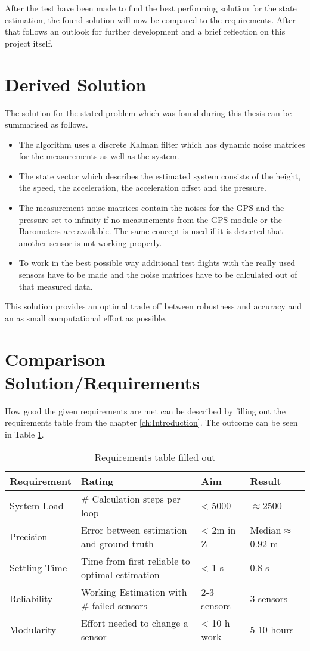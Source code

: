After the test have been made to find the best performing solution for the state estimation,
the found solution will now be compared to the requirements.
After that follows an outlook for further development and a brief reflection on this project itself.

\section{Derived Solution}
The solution for the stated problem which was found during this thesis can be summarised as follows.
\begin{itemize}
 \item The algorithm uses a discrete Kalman filter which has dynamic noise matrices for the measurements as well as the system.
 \item The state vector which describes the estimated system consists of the height, the speed, the acceleration, the acceleration offset and the pressure.
 \item The measurement noise matrices contain the noises for the GPS and the pressure set to infinity if no measurements from the GPS module or the Barometers are available.
The same concept is used if it is detected that another sensor is not working properly.
 \item To work in the best possible way additional test flights with the really used sensors have to be made and the noise matrices have to be calculated out of that measured data.
\end{itemize}

This solution provides an optimal trade off between robustness and accuracy and an as small computational effort as possible.

\section{Comparison Solution/Requirements}
How good the given requirements are met can be described by filling out the requirements table from the chapter \ref{ch:Introduction}.
The outcome can be seen in Table \ref{tab:RequirementsFilledOut}.

 \begin{table}[h]
 \centering
 \begin{tabular}{|l|l|l|l|}
 \hline
 \bf{Requirement}   & \bf{Rating} & \bf{Aim} & \bf{Result} \\ \hline
 System Load   & \# Calculation steps per loop & < 5000 & $\approx$2500 \\ \hline
 Precision     & Error between estimation and ground truth  & < 2m in Z & Median$\approx$ 0.92 m  \\ \hline
 Settling Time & Time from first reliable to optimal estimation  & < 1 s &  0.8 s\\ \hline
 Reliability   & Working Estimation with \# failed sensors & 2-3 sensors & 3 sensors \\ \hline
 Modularity    & Effort needed to change a sensor & < 10 h work &  5-10 hours \\ \hline
 \end{tabular}
 \caption{Requirements table filled out}
 \label{tab:RequirementsFilledOut}
 \end{table}


